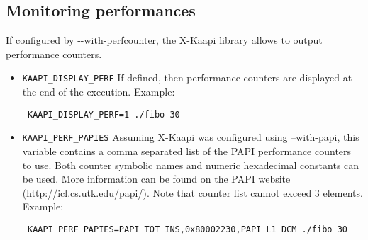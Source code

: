 \documentclass{article}
\newcommand{\kaapi}{\textsc{X}-Kaapi\xspace}
\begin{document}
\subsection{Monitoring performances}
If configured by \url{--with-perfcounter}, the \kaapi library allows to
output performance counters.

\begin{itemize}
\item \verb+KAAPI_DISPLAY_PERF+\newline
If defined, then performance counters are displayed at the end of the execution.
Example:
\begin{verbatim}
 KAAPI_DISPLAY_PERF=1 ./fibo 30
\end{verbatim}

\item \verb+KAAPI_PERF_PAPIES+\newline
Assuming \kaapi was configured using --with-papi, this variable contains a
comma separated list of the PAPI performance counters to use.
Both counter symbolic names and numeric hexadecimal constants can be used.
More information can be found on the PAPI website
(http://icl.cs.utk.edu/papi/).
Note that counter list cannot exceed 3 elements.
Example:
\begin{verbatim}
 KAAPI_PERF_PAPIES=PAPI_TOT_INS,0x80002230,PAPI_L1_DCM ./fibo 30
\end{verbatim}

\end{itemize}
\end{document}
